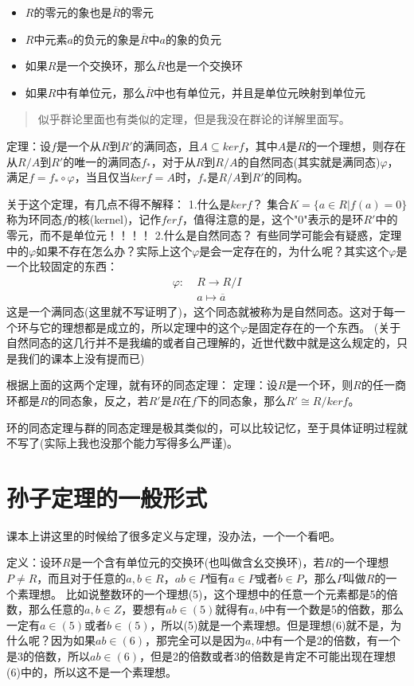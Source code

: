 \documentclass[12pt, a4paper, oneside]{ctexart}
\newenvironment{myquote}{\begin{quote}\small\color{gray}}{\end{quote}}
\begin{document}
\begin{itemize}[leftmargin=*]
\item $R$的零元的象也是$\overline{R}$的零元
\item $R$中元素$a$的负元的象是$\overline{R}$中$a$的象的负元
\item 如果$R$是一个交换环，那么$\overline{R}$也是一个交换环
\item 如果$R$中有单位元，那么$\overline{R}$中也有单位元，并且是单位元映射到单位元
\end{itemize}

\begin{myquote}
似乎群论里面也有类似的定理，但是我没在群论的详解里面写。
\end{myquote}

定理：设$f$是一个从$R$到$R'$的满同态，且$A\subseteq ker f$，其中$A$是$R$的一个理想，则存在从$R/A$到$R'$的唯一的满同态$f_*$，对于从$R$到$R/A$的自然同态(其实就是满同态)$\varphi$，满足$f=f_*\circ\varphi$，当且仅当$ker f=A$时，$f_*$是$R/A$到$R'$的同构。

关于这个定理，有几点不得不解释：
1.什么是$ker f$？
集合$K=\{a\in R|f(a)=0\}$称为环同态$f$的核(kernel)，记作$fer f$，值得注意的是，这个"0"表示的是环$R'$中的零元，而不是单位元！！！！
2.什么是自然同态？
有些同学可能会有疑惑，定理中的$\varphi$如果不存在怎么办？实际上这个$\varphi$是会一定存在的，为什么呢？其实这个$\varphi$是一个比较固定的东西：
\[
\begin{aligned}
\varphi:\;&R\rightarrow R/I\\
&a\mapsto \overline{a}
\end{aligned}
\]
这是一个满同态(这里就不写证明了)，这个同态就被称为是自然同态。这对于每一个环与它的理想都是成立的，所以定理中的这个$\varphi$是固定存在的一个东西。
(关于自然同态的这几行并不是我编的或者自己理解的，近世代数中就是这么规定的，只是我们的课本上没有提而已)

根据上面的这两个定理，就有环的同态定理：
定理：设$R$是一个环，则$R$的任一商环都是$R$的同态象，反之，若$R'$是$R$在$f$下的同态象，那么$R'\cong R/ker f$。

环的同态定理与群的同态定理是极其类似的，可以比较记忆，至于具体证明过程就不写了(实际上我也没那个能力写得多么严谨)。

\section{孙子定理的一般形式}

课本上讲这里的时候给了很多定义与定理，没办法，一个一个看吧。

定义：设环$R$是一个含有单位元的交换环(也叫做含幺交换环)，若$R$的一个理想$P\neq R$，而且对于任意的$a,b\in R$，$ab\in P$恒有$a\in P$或者$b\in P$，那么$P$叫做$R$的一个素理想。
比如说整数环的一个理想(5)，这个理想中的任意一个元素都是5的倍数，那么任意的$a,b\in Z$，要想有$ab\in (5)$就得有$a,b$中有一个数是5的倍数，那么一定有$a\in (5)$或者$b\in (5)$，所以(5)就是一个素理想。但是理想(6)就不是，为什么呢？因为如果$ab\in (6)$，那完全可以是因为$a,b$中有一个是2的倍数，有一个是3的倍数，所以$ab\in (6)$，但是2的倍数或者3的倍数是肯定不可能出现在理想(6)中的，所以这不是一个素理想。
\end{document}
